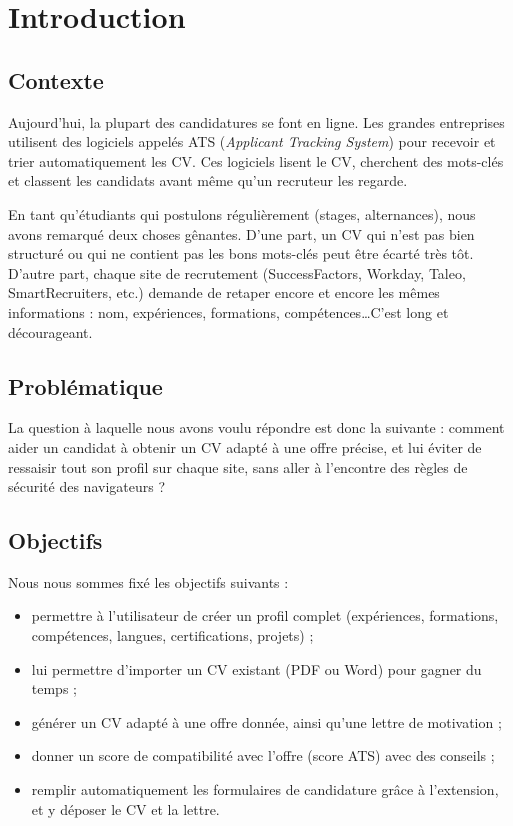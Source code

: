 \documentclass[12pt,a4paper]{report}
\begin{document}
\tableofcontents
\thispagestyle{fancy}

\chapter{Introduction}

\section{Contexte}
Aujourd'hui, la plupart des candidatures se font en ligne. Les grandes
entreprises utilisent des logiciels appel\'es ATS (\textit{Applicant Tracking
System}) pour recevoir et trier automatiquement les CV. Ces logiciels lisent le
CV, cherchent des mots-cl\'es et classent les candidats avant m\^eme qu'un recruteur
les regarde.

En tant qu'\'etudiants qui postulons r\'eguli\`erement (stages, alternances), nous
avons remarqu\'e deux choses g\^enantes. D'une part, un CV qui n'est pas bien
structur\'e ou qui ne contient pas les bons mots-cl\'es peut \^etre \'ecart\'e tr\`es t\^ot.
D'autre part, chaque site de recrutement (SuccessFactors, Workday, Taleo,
SmartRecruiters, etc.) demande de retaper encore et encore les m\^emes
informations : nom, exp\'eriences, formations, comp\'etences\ldots C'est long et
d\'ecourageant.

\section{Probl\'ematique}
La question \`a laquelle nous avons voulu r\'epondre est donc la suivante : comment
aider un candidat \`a obtenir un CV adapt\'e \`a une offre pr\'ecise, et lui \'eviter de
ressaisir tout son profil sur chaque site, sans aller \`a l'encontre des r\`egles de
s\'ecurit\'e des navigateurs ?

\section{Objectifs}
Nous nous sommes fix\'e les objectifs suivants :
\begin{itemize}[leftmargin=1.4em, itemsep=2pt]
  \item permettre \`a l'utilisateur de cr\'eer un profil complet (exp\'eriences,
  formations, comp\'etences, langues, certifications, projets) ;
  \item lui permettre d'importer un CV existant (PDF ou Word) pour gagner du
  temps ;
  \item g\'en\'erer un CV adapt\'e \`a une offre donn\'ee, ainsi qu'une lettre de
  motivation ;
  \item donner un score de compatibilit\'e avec l'offre (score ATS) avec des
  conseils ;
  \item remplir automatiquement les formulaires de candidature gr\^ace \`a
  l'extension, et y d\'eposer le CV et la lettre.
\end{itemize}
\end{document}
